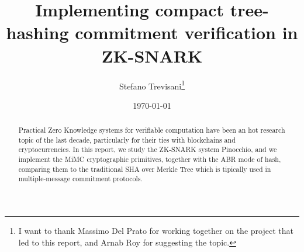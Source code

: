 \documentclass{article}
\author{Stefano Trevisani\footnote{I want to thank Massimo Del Prato for working together on the 
project that led to this report, and Arnab Roy for suggesting the topic.}}
\date{\today}
\title{Implementing compact tree-hashing commitment verification in ZK-SNARK}
\theoremstyle{definition}
\theoremstyle{theorem}
\theoremstyle{example}
\begin{document}
\maketitle
\begin{abstract}
	Practical Zero Knowledge systems for verifiable computation have been an hot research topic
	of the last decade, particularly for their ties with blockchains and cryptocurrencies.
	In this report, we study the ZK-SNARK system Pinocchio, and we implement the MiMC cryptographic
	primitives, together with the ABR mode of hash, comparing them to the traditional SHA over Merkle
	Tree which is tipically used in multiple-message commitment protocols.
\end{abstract}
\clearpage
\tableofcontents





\end{document}
